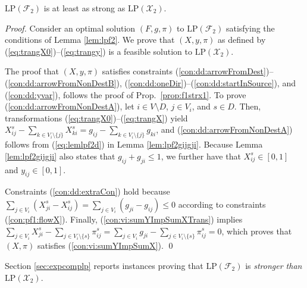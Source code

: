 \begin{prop}
\label{prop:f2strx2}
$\text{LP}(\mathcal{F}_2)$ is at least as strong as $\text{LP}(\mathcal{X}_2)$. 
\end{prop}
\begin{proof}
Consider an optimal solution $(F,g,\pi)$ to $\text{LP}(\mathcal{F}_2)$ satisfying the conditions of Lemma \ref{lem:lpf2}.
We prove that $(X,y,\pi)$ as defined by (\ref{eq:trangX0})--(\ref{eq:trangy}) is a feasible solution to $\text{LP}(\mathcal{X}_2)$.

The proof that $(X,y,\pi)$ satisfies constraints (\ref{con:dd:arrowFromDest})--(\ref{con:dd:arrowFromNonDestB}), (\ref{con:dd:oneDir})--(\ref{con:dd:startInSource}),
and (\ref{con:dd:yvar}),
follows the proof of Prop.\ \ref{prop:f1strx1}.
To prove (\ref{con:dd:arrowFromNonDestA}), let $i\in V\setminus D$, $j\in V_i$, and $s\in D$.
Then, transformations (\ref{eq:trangX0})--(\ref{eq:trangX}) yield
$X_{ij}^s - \sum_{k\in V_{i}\setminus \{j\}}X_{ki}^s
= g_{ij} - \sum_{k\in V_{i}\setminus \{j\}}g_{ki}$, and (\ref{con:dd:arrowFromNonDestA}) follows from (\ref{eq:lemlpf2d}) in Lemma \ref{lem:lpf2gijgji}.
Because Lemma \ref{lem:lpf2gijgji} also states that $g_{ij}+g_{ji}\leq 1$, we further have that $X_{ij}^s\in[0,1]$ and $y_{ij}\in[0,1]$.

Constraints (\ref{con:dd:extraCon}) hold because
$\sum_{j\in V_i}\left(X_{ji}^s-X_{ij}^s\right)=\sum_{j\in V_i}\left(g_{ji}-g_{ij}\right)\leq 0$
according to constraints (\ref{con:pf1:flowX}).
Finally, (\ref{con:vi:sumYImpSumXTrans}) implies
$\sum_{j\in V_i}X_{ji}^s-\sum_{j\in V_i\setminus\{s\}}\pi_{ij}^s=\sum_{j\in V_i}g_{ji}-\sum_{j\in V_i\setminus\{s\}}\pi_{ij}^s=0$,
which proves that $(X,\pi)$ satisfies (\ref{con:vi:sumYImpSumX}).
\qed\end{proof}

\begin{remark}
\label{rem:f2strx2}
Section \ref{sec:expcomplp} reports instances proving that $\text{LP}(\mathcal{F}_2)$ is \emph{stronger than} $\text{LP}(\mathcal{X}_2)$. 
\end{remark}
